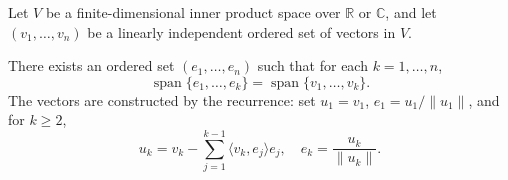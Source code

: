 \begin{theorem} \label{theorem:gram_schmidt_orthogonalization_process}
    Let $V$ be a finite-dimensional inner product space over $\mathbb{R}$ or $\mathbb{C}$, and let $(v_1, \dots, v_n)$ be a linearly independent ordered set of vectors in $V$.

    There exists an  ordered set $(e_1, \dots, e_n)$ such that for each $k = 1, \dots, n$,
    $$\operatorname{span}\{e_1, \dots, e_k\} = \operatorname{span}\{v_1, \dots, v_k\}.$$
    The vectors are constructed by the recurrence: set $u_1 = v_1$, $e_1 = u_1 / \|u_1\|$, and for $k \geq 2$,
    $$u_k = v_k - \sum_{j=1}^{k-1} \langle v_k, e_j \rangle e_j, \quad e_k = \frac{u_k}{\|u_k\|}.$$
\end{theorem}
